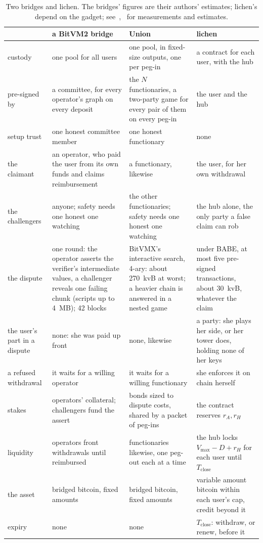 \documentclass[11pt]{article}
\newcommand{\vmax}{V_{\max}}
\newcommand{\Tc}{T_{\mathrm{close}}}
\begin{document}
\begin{table}[!tp]
\centering
\small
\begin{tabularx}{\linewidth}{>{\raggedright\arraybackslash}p{21mm}LLL}
\toprule
& a BitVM2 bridge & Union & lichen \\
\midrule
custody & one pool for all users & one pool, in fixed-size outputs, one per peg-in & a contract for each user, with the hub \\
pre-signed by & a committee, for every operator's graph on every deposit & the $N$ functionaries, a two-party game for every pair of them on every peg-in & the user and the hub \\
setup trust & one honest committee member & one honest functionary & none \\
the claimant & an operator, who paid the user from its own funds and claims reimbursement & a functionary, likewise & the user, for her own withdrawal \\
the challengers & anyone; safety needs one honest one watching & the other functionaries; safety needs one honest one watching & the hub alone, the only party a false claim can rob \\
the dispute & one round: the operator asserts the verifier's intermediate values, a challenger reveals one failing chunk (scripts up to 4~MB); 42 blocks & BitVMX's interactive search, 4-ary: about 270~kvB at worst; a heavier chain is answered in a nested game & under BABE, at most five pre-signed transactions, about 30~kvB, whatever the claim \\
the user's part in a dispute & none: she was paid up front & none, likewise & a party: she plays her side, or her tower does, holding none of her keys \\
a refused withdrawal & it waits for a willing operator & it waits for a willing functionary & she enforces it on chain herself \\
stakes & operators' collateral; challengers fund the assert & bonds sized to dispute costs, shared by a packet of peg-ins & the contract reserves $r_A, r_H$ \\
liquidity & operators front withdrawals until reimbursed & functionaries likewise, one peg-out each at a time & the hub locks $\vmax - D + r_H$ for each user until $\Tc$ \\
the asset & bridged bitcoin, fixed amounts & bridged bitcoin, fixed amounts & variable amount bitcoin within each user's cap, credit beyond it \\
expiry & none & none & $\Tc$: withdraw, or renew, before it \\
\bottomrule
\end{tabularx}
\caption{Two bridges and lichen. The bridges' figures are their
authors' estimates; lichen's depend on the gadget; see~\cite{lichenbitvmx},~\cite{lichenbuilt} for measurements and estimates.}
\label{tab:bitvm2}
\end{table}
\end{document}
